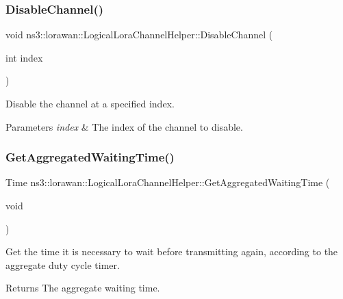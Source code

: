 \subsubsection{\texorpdfstring{Disable\+Channel()}{DisableChannel()}}
{\footnotesize\ttfamily void ns3\+::lorawan\+::\+Logical\+Lora\+Channel\+Helper\+::\+Disable\+Channel (\begin{DoxyParamCaption}\item[{int}]{index }\end{DoxyParamCaption})}

Disable the channel at a specified index.


\begin{DoxyParams}{Parameters}
{\em index} & The index of the channel to disable. \\
\hline
\end{DoxyParams}
\mbox{\label{classns3_1_1lorawan_1_1LogicalLoraChannelHelper_a532db364466139b87e62c07cb2a85414}} 
\subsubsection{\texorpdfstring{Get\+Aggregated\+Waiting\+Time()}{GetAggregatedWaitingTime()}}
{\footnotesize\ttfamily Time ns3\+::lorawan\+::\+Logical\+Lora\+Channel\+Helper\+::\+Get\+Aggregated\+Waiting\+Time (\begin{DoxyParamCaption}\item[{void}]{ }\end{DoxyParamCaption})}

Get the time it is necessary to wait before transmitting again, according to the aggregate duty cycle timer.

\begin{DoxyReturn}{Returns}
The aggregate waiting time. 
\end{DoxyReturn}
\mbox{\label{classns3_1_1lorawan_1_1LogicalLoraChannelHelper_ac6acb9dfa7eb69194cf8cb132da82cb8}} 
